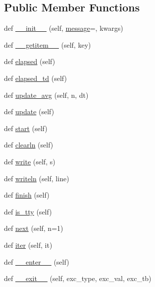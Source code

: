 \subsection*{Public Member Functions}
\begin{DoxyCompactItemize}
\item 
def \hyperlink{classpip_1_1__vendor_1_1progress_1_1Infinite_ad71fba9b95a6f69f9240a759e46e09bf}{\+\_\+\+\_\+init\+\_\+\+\_\+} (self, \hyperlink{classpip_1_1__vendor_1_1progress_1_1Infinite_adba57b5762fbe7cbfe4635242bb303e3}{message}=\textquotesingle{}\textquotesingle{}, kwargs)
\item 
def \hyperlink{classpip_1_1__vendor_1_1progress_1_1Infinite_ae6f3c363dd30b38b25305dde6b06b68d}{\+\_\+\+\_\+getitem\+\_\+\+\_\+} (self, key)
\item 
def \hyperlink{classpip_1_1__vendor_1_1progress_1_1Infinite_a1e68ff4f1402a63d543712dc403d8904}{elapsed} (self)
\item 
def \hyperlink{classpip_1_1__vendor_1_1progress_1_1Infinite_a5290726f80323a9a57232b6a2c5584ed}{elapsed\+\_\+td} (self)
\item 
def \hyperlink{classpip_1_1__vendor_1_1progress_1_1Infinite_a8035c30e99083a632533e4690ddaf78e}{update\+\_\+avg} (self, n, dt)
\item 
def \hyperlink{classpip_1_1__vendor_1_1progress_1_1Infinite_a9dfb83a7d59007b4dc13cbbe64e05661}{update} (self)
\item 
def \hyperlink{classpip_1_1__vendor_1_1progress_1_1Infinite_a5cb9dab53e92cbb2604628b830dbb4ca}{start} (self)
\item 
def \hyperlink{classpip_1_1__vendor_1_1progress_1_1Infinite_aaddc9da3c935ed1dc1775259ff37c657}{clearln} (self)
\item 
def \hyperlink{classpip_1_1__vendor_1_1progress_1_1Infinite_ab0a18532939fe485bab1c79397284b01}{write} (self, s)
\item 
def \hyperlink{classpip_1_1__vendor_1_1progress_1_1Infinite_aa8656c55c84ad3f0722d7e4c835036dc}{writeln} (self, line)
\item 
def \hyperlink{classpip_1_1__vendor_1_1progress_1_1Infinite_afa3eb503585551d4ed65580527086133}{finish} (self)
\item 
def \hyperlink{classpip_1_1__vendor_1_1progress_1_1Infinite_acb2f63aeaa69421962c9272843da1974}{is\+\_\+tty} (self)
\item 
def \hyperlink{classpip_1_1__vendor_1_1progress_1_1Infinite_a4d198b1f87d7e88699771feb9f4d6630}{next} (self, n=1)
\item 
def \hyperlink{classpip_1_1__vendor_1_1progress_1_1Infinite_a8041b71a97f20e9c8a65d89f18a0ee9b}{iter} (self, it)
\item 
def \hyperlink{classpip_1_1__vendor_1_1progress_1_1Infinite_ad0ae9c8227745f75fd75c6791de2125f}{\+\_\+\+\_\+enter\+\_\+\+\_\+} (self)
\item 
def \hyperlink{classpip_1_1__vendor_1_1progress_1_1Infinite_a043b068b5cbfabc765b3d8dbebf081fc}{\+\_\+\+\_\+exit\+\_\+\+\_\+} (self, exc\+\_\+type, exc\+\_\+val, exc\+\_\+tb)
\end{DoxyCompactItemize}
